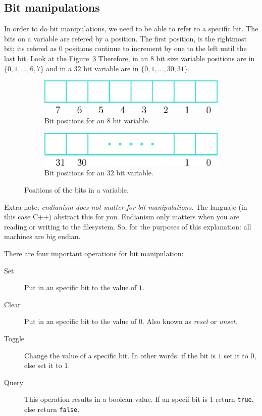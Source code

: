\subsection{Bit manipulations}

In order to do bit manipulations, we need to be able to refer to a specific bit.
The bits on a variable are refered by a position.
The first position, is the rightmost bit; its refered as $0$ positions continue to increment by one to the left until the last bit.
Look at the Figure~\ref{fig:bitPos}
Therefore, in an $8$ bit size variable positions are in $\{ 0, 1, \ldots, 6, 7 \}$ and in a $32$ bit variable are in $\{ 0, 1, \ldots, 30, 31 \}$.

\begin{figure}[htb]
  \centering
  \begin{subfigure}[b]{0.35\textwidth}
    \includegraphics[width=\textwidth]{img/bitPositions}
    \caption{Bit positions for an $8$ bit variable.}
    \label{fig:bitPosa}
  \end{subfigure}
  \hspace*{1cm}
  \begin{subfigure}[b]{0.35\textwidth}
    \includegraphics[width=\textwidth]{img/bitPositions2}
    \caption{Bit positions for an $32$ bit variable.}
    \label{fig:bitPosb}
  \end{subfigure}
  \caption{Positions of the bits in a variable.}
  \label{fig:bitPos}
\end{figure}

Extra note: \emph{endianism does not matter for bit manipulations}.
The languaje (in this case C++) abstract this for you.
Endianism only matters when you are reading or writing to the filesystem.
So, for the purposes of this explanation: all machines are big endian.

There are four important operations for bit manipulation:
\begin{description}
\item[Set] Put in an specific bit to the value of $1$.
\item[Clear] Put in an specific bit to the value of $0$. Also known as \emph{reset} or \emph{unset}.
\item[Toggle] Change the value of a specific bit. In other words: if the bit is $1$ set it to $0$, else set it to $1$.
\item[Query] This operation results in a boolean value. If an specif bit is $1$ return \texttt{true}, else return \texttt{false}.
\end{description}


